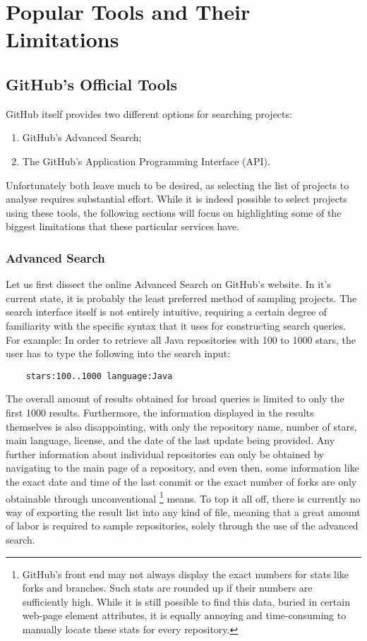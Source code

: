 \chapter{Popular Tools and Their Limitations}

\section{GitHub's Official Tools}

GitHub itself provides two different options for searching projects:
\begin{enumerate}
    \item GitHub's Advanced Search;
    \item The GitHub's Application Programming Interface (API).
\end{enumerate}
Unfortunately both leave much to be desired, as selecting the list of projects to analyse requires substantial effort.
While it is indeed possible to select projects using these tools, the following sections will focus on highlighting some of the biggest limitations that these particular services have.

\subsection{Advanced Search}

Let us first dissect the online Advanced Search on GitHub's website.
In it's current state, it is probably the least preferred method of sampling projects.
The search interface itself is not entirely intuitive, requiring a certain degree of familiarity with the specific syntax that it uses for constructing search queries.
For example: In order to retrieve all Java repositories with 100 to 1000 stars, the user has to type the following into the search input:
\begin{verbatim}
    stars:100..1000 language:Java
\end{verbatim}
The overall amount of results obtained for broad queries is limited to only the first 1000 results.
Furthermore, the information displayed in the results themselves is also disappointing, with only the repository name, number of stars, main language, license, and the date of the last update being provided.
Any further information about individual repositories can only be obtained by navigating to the main page of a repository, and even then, some information like the exact date and time of the last commit or the exact number of forks are only obtainable through unconventional
\footnote{GitHub's front end may not always display the exact numbers for stats like forks and branches.
Such stats are rounded up if their numbers are sufficiently high.
While it is still possible to find this data, buried in certain web-page element attributes, it is equally annoying and time-consuming to manually locate these stats for every repository.} means.
To top it all off, there is currently no way of exporting the result list into any kind of file, meaning that a great amount of labor is required to sample repositories, solely through the use of the advanced search.

